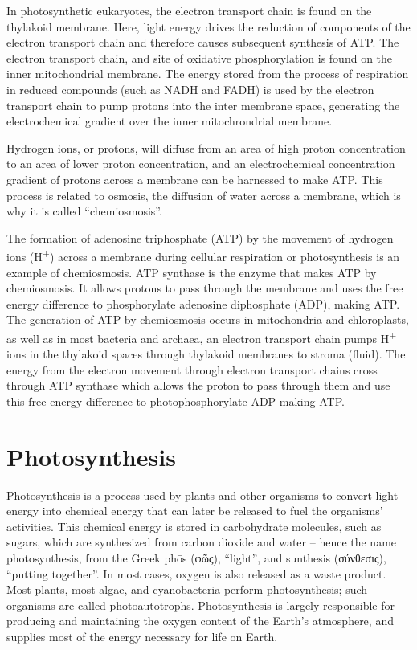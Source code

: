 In photosynthetic eukaryotes, the electron transport chain is found on the thylakoid membrane. Here, light energy drives the reduction of components of the electron transport chain and therefore causes subsequent synthesis of ATP. The electron transport chain, and site of oxidative phosphorylation is found on the inner mitochondrial membrane. The energy stored from the process of respiration in reduced compounds (such as NADH and FADH) is used by the electron transport chain to pump protons into the inter membrane space, generating the electrochemical gradient over the inner mitochrondrial membrane.

Hydrogen ions, or protons, will diffuse from an area of high proton concentration to an area of lower proton concentration, and an electrochemical concentration gradient of protons across a membrane can be harnessed to make ATP. This process is related to osmosis, the diffusion of water across a membrane, which is why it is called ``chemiosmosis''.

The formation of adenosine triphosphate (ATP) by the movement of hydrogen ions (H\textsuperscript{+}) across a membrane during cellular respiration or photosynthesis is an example of chemiosmosis. ATP synthase is the enzyme that makes ATP by chemiosmosis. It allows protons to pass through the membrane and uses the free energy difference to phosphorylate adenosine diphosphate (ADP), making ATP. The generation of ATP by chemiosmosis occurs in mitochondria and chloroplasts, as well as in most bacteria and archaea, an electron transport chain pumps H\textsuperscript{+} ions in the thylakoid spaces through thylakoid membranes to stroma (fluid). The energy from the electron movement through electron transport chains cross through ATP synthase which allows the proton to pass through them and use this free energy difference to photophosphorylate ADP making ATP.

\hypertarget{photosynthesis}{%
\section{Photosynthesis}\label{photosynthesis}}

Photosynthesis is a process used by plants and other organisms to convert light energy into chemical energy that can later be released to fuel the organisms' activities. This chemical energy is stored in carbohydrate molecules, such as sugars, which are synthesized from carbon dioxide and water -- hence the name photosynthesis, from the Greek phōs (φῶς), ``light'', and sunthesis (σύνθεσις), ``putting together''. In most cases, oxygen is also released as a waste product. Most plants, most algae, and cyanobacteria perform photosynthesis; such organisms are called photoautotrophs. Photosynthesis is largely responsible for producing and maintaining the oxygen content of the Earth's atmosphere, and supplies most of the energy necessary for life on Earth.



